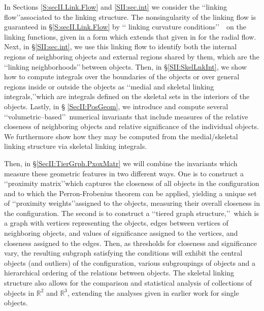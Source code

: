 \documentclass[10pt]{amsart}
\theoremstyle{definition}
\theoremstyle{definition}
\numberwithin{equation}{section}
\newcommand{\R}{{\mathbb R}}
\begin{document}
In Sections \ref{S:secII.Link.Flow} and \ref{SII:sec.int} we consider the 
\lq\lq linking flow\rq\rq associated to the linking structure. The 
nonsingularity 
of the linking flow is guaranteed in \S \ref{S:secII.Link.Flow} by \lq\lq 
linking 
curvature conditions\rq\rq\ \, on the linking functions, given in a form 
which extends that given in \cite[Thm 2.5]{D1} for the radial flow.  Next, 
in \S \ref{SII:sec.int}, we use this linking flow to identify both the 
internal regions of neighboring objects and external regions shared by 
them, which are the \lq\lq linking neighborhoods\rq\rq \,between objects.  
Then, in \S \ref{SII:SkelLnkInt}, we show how to compute integrals over
the boundaries of the objects or over general regions inside or outside the
objects as \lq\lq medial and skeletal linking integrals,\rq\rq which are 
integrals 
defined on the skeletal sets in the interiors of the objects.  Lastly, in \S 
\ref{SecII:PosGeom}, we introduce and compute several 
\lq\lq volumetric--based\rq\rq\ numerical invariants that include 
measures of the relative closeness of neighboring 
objects and relative significance of the individual objects.  
We furthermore show how they may be computed from the medial/skeletal 
linking structure  via skeletal linking integrals.
\par
Then, in \S \ref{SecII:TierGrph.PxoxMatr} we will combine the invariants 
which measure these geometric features in two different ways.  One is to 
construct a \lq\lq proximity matrix\rq\rq which captures the closeness 
of all objects in the configuration and to which the Perron-Frobenius 
theorem can be applied, yielding a unique set of \lq\lq proximity 
weights\rq\rq assigned to the objects, measuring their overall closeness 
in the configuration.  The 
second is to construct a \lq\lq tiered graph structure,\rq\rq\, which is a 
graph with vertices representing the objects, edges between vertices of 
neighboring 
objects, and values of significance assigned to the vertices, and closeness 
assigned to the edges.  Then, as thresholds for closeness and significance 
vary, the resulting subgraph satisfying the conditions will exhibit the 
central objects (and outliers) of the configuration, various subgroupings 
of objects and 
a hierarchical ordering of the relations between objects.    The 
skeletal linking structure also allows for the comparison and statistical 
analysis of collections of objects in $\R^2$ and $\R^3$, extending the 
analyses given in earlier work for single objects.  \par
\end{document}
